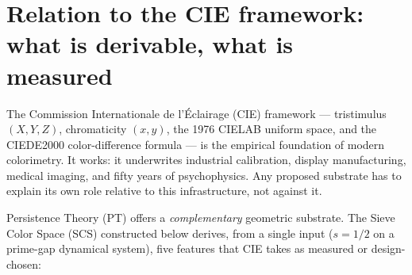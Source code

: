 \documentclass[12pt,a4paper]{article}
\begin{document}
\begin{abstract}
\medskip\noindent\textbf{Open invitations.} Three falsifiable
predictions, each tractable in a three-month experiment, are stated
in \S\ref{sec:open_problems}: a Koide-saturation JND null at
$S/S_{\max} = 1/\sqrt{2}$; a CRT-driven chromatic-discrimination
ceiling at $3 \times 5 \times 7 = 105$ states; and a fourth-channel
signature from $p = 11$ in tetrachromats. Code, COMBVD splits,
MacAdam fits, and a public leaderboard are released at
\href{https://github.com/Igrekess/SieveColorSpace}{github.com/Igrekess/SieveColorSpace}
(archived on Zenodo: \href{https://zenodo.org/records/19614967}{10.5281/zenodo.19614967} for this article; the broader Persistence Theory monograph is at \href{https://zenodo.org/records/19583187}{10.5281/zenodo.19583187}).
We do not claim SCS is finished; we claim it is testable.
This article is self-contained: an appendix provides self-contained
derivations of the Persistence Theory results used --- forbidden sieve
transitions, the parameter $s = 1/2$, the sum rule, the vertex--edge
bifurcation, the holonomy identity, anomalous dimensions, the active
prime criterion, and the fixed point $\mustar = 15$ --- so that no
external reference is needed to verify the deductive chain.
\end{abstract}

\tableofcontents
\newpage

\section{Relation to the CIE framework: what is derivable, what is measured}
\label{sec:intro}

The Commission Internationale de l'\'Eclairage (CIE) framework ---
tristimulus $(X, Y, Z)$, chromaticity $(x, y)$, the 1976 CIELAB uniform
space, and the CIEDE2000 color-difference formula --- is the empirical
foundation of modern colorimetry. It works: it underwrites industrial
calibration, display manufacturing, medical imaging, and fifty years of
psychophysics. Any proposed substrate has to explain its own role
relative to this infrastructure, not against it.

Persistence Theory (PT) offers a \emph{complementary} geometric
substrate. The Sieve Color Space (SCS) constructed below derives, from
a single input ($s = 1/2$ on a prime-gap dynamical system), five
features that CIE takes as measured or design-chosen:
\end{document}
